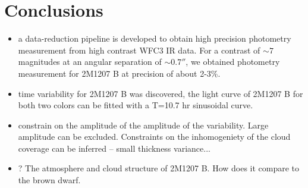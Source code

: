 \documentclass[apj]{emulateapj}
\begin{document}
\section{Conclusions}
\begin{itemize}
\item a data-reduction pipeline is developed to obtain high precision
  photometry measurement from high contrast WFC3 IR data. For a
  contrast of $\sim 7$ magnitudes at an angular separation of
  $\sim0.7''$, we obtained photometry measurement for 2M1207 B at
  precision of about 2-3\%. 
\item time variability for 2M1207 B was discovered, the light curve of
  2M1207 B for both two colors can be fitted with a T=10.7 hr
  sinusoidal curve.
\item constrain on the amplitude of the amplitude of the
  variability. Large amplitude can be excluded. Constraints on the
  inhomogeniety of the cloud coverage can be inferred -- small
  thickness variance...
\item ? The atmosphere and cloud structure of 2M1207 B. How does it
  compare to the brown dwarf.
\end{itemize}



\end{document}
